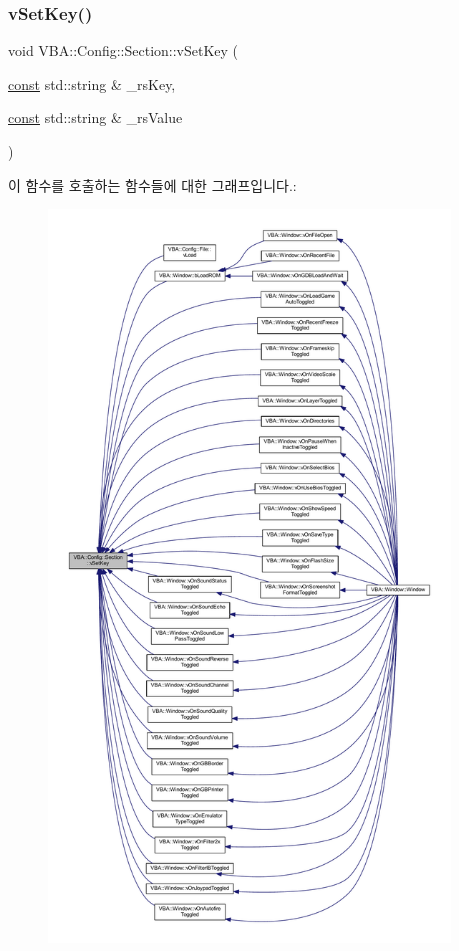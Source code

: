 \subsubsection{\texorpdfstring{v\+Set\+Key()}{vSetKey()}\hspace{0.1cm}{\footnotesize\ttfamily [1/2]}}
{\footnotesize\ttfamily void V\+B\+A\+::\+Config\+::\+Section\+::v\+Set\+Key (\begin{DoxyParamCaption}\item[{\mbox{\hyperlink{getopt1_8c_a2c212835823e3c54a8ab6d95c652660e}{const}} std\+::string \&}]{\+\_\+rs\+Key,  }\item[{\mbox{\hyperlink{getopt1_8c_a2c212835823e3c54a8ab6d95c652660e}{const}} std\+::string \&}]{\+\_\+rs\+Value }\end{DoxyParamCaption})}

이 함수를 호출하는 함수들에 대한 그래프입니다.\+:
\nopagebreak
\begin{figure}[H]
\begin{center}
\leavevmode
\includegraphics[height=550pt]{class_v_b_a_1_1_config_1_1_section_a57e1b95cbea40db71c093381beff4b0e_icgraph}
\end{center}
\end{figure}
\mbox{\label{class_v_b_a_1_1_config_1_1_section_afd12017e2b18dd1e1be08dde721a37d0}} 
